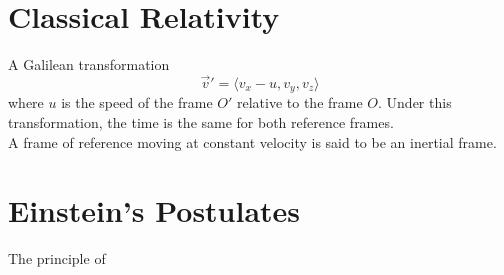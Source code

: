 \documentclass{subfiles}
\begin{document}
	\section{Classical Relativity}
		A Galilean transformation
			\[\vec{v}' = \langle v_x - u, v_y, v_z\rangle\]	
			where \(u\) is the speed of the frame \(O'\) relative to the frame \(O\). Under this transformation, the time is the same for both reference frames. \\
			A frame of reference moving at constant velocity is said to be an inertial frame.
	\section{Einstein's Postulates}
		The principle of 
\end{document}
